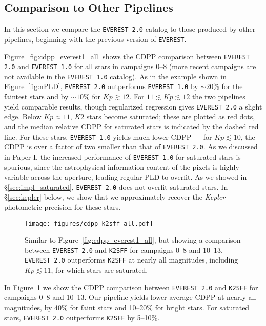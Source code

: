\documentclass[]{emulateapj}
\newcommand{\Kp}{\ensuremath{Kp}}
\newcommand{\edited}[1]{{\color{red} #1}}
\begin{document}
\subsection{Comparison to Other Pipelines}
\label{sec:comparison}
In this section we compare the \texttt{EVEREST 2.0} catalog to those produced by other pipelines, beginning with the
previous version of \texttt{EVEREST}.

Figure~\ref{fig:cdpp_everest1_all} shows the CDPP comparison between \texttt{EVEREST 2.0} and
\texttt{EVEREST 1.0} for all stars in campaigns 0--8 \edited{(more recent campaigns are not available in the
\texttt{EVEREST 1.0} catalog)}. As in the example shown in Figure~\ref{fig:nPLD},
\texttt{EVEREST 2.0} outperforms \texttt{EVEREST 1.0} by ${\sim}20\%$ for the faintest stars and by
${\sim}10\%$ for $\Kp \gtrsim 12$. For $11 \lesssim \Kp \lesssim 12$ the two pipelines yield
comparable results, though regularized regression gives \texttt{EVEREST 2.0} a slight edge. Below
$\Kp \approx 11$, $K2$ stars become saturated; these are plotted as red dots, and the median
relative CDPP for saturated stars is indicated by the dashed red line. For these stars,
\texttt{EVEREST 1.0} yields much lower CDPP --- for $\Kp \lesssim 10$, the CDPP is over a factor
of two smaller than that of \texttt{EVEREST 2.0}. As we discussed in Paper I, the increased
performance of \texttt{EVEREST 1.0} for saturated stars is spurious, since the astrophysical
information content of the pixels is highly variable across the aperture, leading regular
PLD to overfit. As we showed in \S\ref{sec:impl_saturated}, \texttt{EVEREST 2.0} does not
overfit saturated stars. In \S\ref{sec:kepler} below, we show that we approximately recover
the \emph{Kepler} photometric precision for these stars.

\begin{figure}[hbt]
  \begin{center}
      \texttt{[image: figures/cdpp\_k2sff\_all.pdf]}
       \caption{Similar to Figure~\ref{fig:cdpp_everest1_all}, but showing a comparison between \texttt{EVEREST 2.0} and \texttt{K2SFF} \edited{for
       campaigns 0--8 and 10--13}.
       \texttt{EVEREST 2.0} outperforms \texttt{K2SFF} at \edited{nearly} all magnitudes, including $\Kp \lesssim 11$, for which stars are saturated.}
     \label{fig:cdpp_k2sff_all}
  \end{center}
\end{figure}

In Figure~\ref{fig:cdpp_k2sff_all} we show the CDPP comparison between \texttt{EVEREST 2.0}
and \texttt{K2SFF} \citep{Vanderburg14,VanderburgJohnson14} \edited{for campaigns 0--8 and 10--13}. Our pipeline yields
lower average CDPP at \edited{nearly} all magnitudes, by 40\% for faint stars and 10--20\% for bright
stars. For saturated stars, \texttt{EVEREST 2.0} outperforms \texttt{K2SFF} by 5--10\%.
\end{document}
